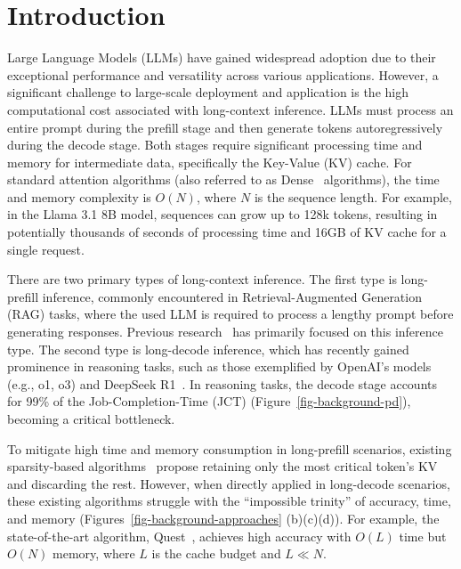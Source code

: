 \section{Introduction}
\label{sec-intro}


Large Language Models (LLMs) have gained widespread adoption due to their exceptional performance and versatility across various applications. However, a significant challenge to large-scale deployment and application is the high computational cost associated with long-context inference. LLMs must process an entire prompt during the prefill stage and then generate tokens autoregressively during the decode stage. Both stages require significant processing time and memory for intermediate data, specifically the Key-Value (KV) cache. For standard attention algorithms (also referred to as Dense~\cite{chenarkvale} algorithms), the time and memory complexity is $O(N)$, where $N$ is the sequence length. For example, in the Llama 3.1 8B model, sequences can grow up to 128k tokens, resulting in potentially thousands of seconds of processing time and 16GB of KV cache for a single request.


There are two primary types of long-context inference. The first type is long-prefill inference, commonly encountered in Retrieval-Augmented Generation (RAG) tasks, where the used LLM is required to process a lengthy prompt before generating responses. Previous research~\cite{cunchen2024memserve, lianmin2024sglang, woosuk2023vllm, jin2024ragcache, yushi2024longbench} has primarily focused on this inference type. The second type is long-decode inference, which has recently gained prominence in reasoning tasks, such as those exemplified by OpenAI’s models~\cite{openai2024o1} (e.g., o1, o3) and DeepSeek R1~\cite{damai2024deepseek}. In reasoning tasks, the decode stage accounts for 99\% of the Job-Completion-Time (JCT) (Figure~\ref{fig-background-pd}), becoming a critical bottleneck.



To mitigate high time and memory consumption in long-prefill scenarios, existing sparsity-based algorithms~\cite{tang2024quest, zhang2023h2o, xiao2023sink} propose retaining only the most critical token's KV and discarding the rest. However, when directly applied in long-decode scenarios, these existing algorithms struggle with the ``impossible trinity'' of accuracy, time, and memory (Figures~\ref{fig-background-approaches} (b)(c)(d)). For example, the state-of-the-art algorithm, Quest~\cite{tang2024quest}, achieves high accuracy with  $O(L)$ time but $O(N)$ memory, where $L$ is the cache budget and $L \ll N$.

